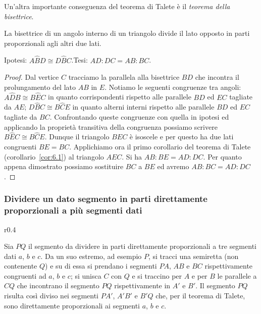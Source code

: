 Un'altra importante conseguenza del teorema di Talete è il 
\emph{teorema della bisettrice}.
\begin{teorema}
La bisettrice di un angolo interno di un triangolo divide il lato 
opposto in parti proporzionali agli altri due lati.
\end{teorema}

\noindent\begin{minipage}{0.65\textwidth}\parindent15pt
\noindent Ipotesi: $A\widehat{B}D\cong D\widehat{B}C$.\tab\tab Tesi: 
$AD : DC = AB : BC$.

\begin{proof}
Dal vertice $C$ tracciamo la parallela alla bisettrice $BD$ che 
incontra il prolungamento del lato $AB$ in $E$. Notiamo le seguenti 
congruenze tra angoli: $A\widehat{D}B\cong B\widehat{E}C$ in quanto 
corrispondenti rispetto alle parallele $BD$ ed $EC$ tagliate da $AE$; 
$D\widehat{B}C\cong B\widehat{C}E$ in quanto alterni interni rispetto 
alle parallele $BD$ ed $EC$ tagliate da $BC$.
Confrontando queste congruenze con quella in ipotesi ed applicando la 
proprietà transitiva della congruenza possiamo scrivere 
$B\widehat{E}C\cong B\widehat{C}E$. Dunque il triangolo $BEC$ è 
isoscele e per questo ha due lati congruenti $BE = BC$.
Applichiamo ora il primo corollario del teorema di Talete 
(corollario~\ref{cor:6.1}) al triangolo $AEC$. Si ha $AB : BE = AD : 
DC$. 
Per quanto appena dimostrato possiamo sostituire $BC$ a $BE$ ed 
avremo $AB : BC = AD : DC$.
\end{proof}
\end{minipage}\hfil
\begin{minipage}{0.35\textwidth}
	\centering
\end{minipage}\vspace{5pt}

\subsubsection{Dividere un dato segmento in parti direttamente 
proporzionali a più segmenti dati}
\nopagebreak
\begin{wrapfigure}{r}{0.4\textwidth}
	\centering
\end{wrapfigure}
Sia $PQ$ il segmento da dividere in parti direttamente proporzionali 
a tre segmenti dati $a$, $b$ e $c$.
Da un suo estremo, ad esempio $P$, si tracci una semiretta (non 
contenente $Q$) e su di essa si prendano i segmenti $PA$, $AB$ e $BC$ 
rispettivamente congruenti ad $a$, $b$ e $c$; si unisca $C$ con $Q$ e 
si traccino per $A$ e per $B$ le parallele a $CQ$ che incontrano il 
segmento $PQ$ rispettivamente in $A'$ e $B'$. Il segmento $PQ$ 
risulta così diviso nei segmenti $PA'$, $A'B'$ e $B'Q$ che, per il 
teorema di Talete, sono direttamente proporzionali ai segmenti $a$, 
$b$ e $c$.

